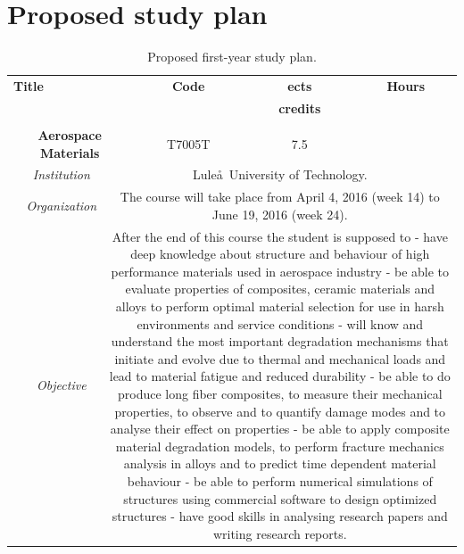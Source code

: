 \documentclass[a4paper, twoside,12pt, abstract]{scrartcl} %
\begin{document}

\clearscrheadings
\pagestyle{scrheadings}
\manualmark
\ofoot{\\\pagemark} %
\ifoot{} %
\setheadtopline{2pt}
\setheadsepline{0.5pt}
\setfootsepline{0.5pt}

\section{Proposed study plan}

\begin{center}
\small
\begin{longtable}{cccccc}
\caption{Proposed first-year study plan.}\\
    \toprule
  \multicolumn{3}{l}{\textbf{Title}}&\textbf{Code} &\textbf{\acrshort{ects}}&\textbf{Hours} \\
   &&&& \textbf{credits}&\\
    \midrule
    &&&&&\\
    \multicolumn{3}{p{0.5\textwidth}}{\textbf{Aerospace Materials}}&T7005T&7.5&\\
    &\textit{Institution}&\multicolumn{4}{p{0.7\textwidth}}{Lule\aa\ University of Technology.}\\
    &\textit{Organization}&\multicolumn{4}{p{0.7\textwidth}}{The course will take place from April 4, 2016 (week 14) to June 19, 2016 (week 24).}\\
    &\textit{Objective}&\multicolumn{4}{p{0.7\textwidth}}{After the end of this course the student is supposed to - have deep knowledge about structure and behaviour of high performance materials used in aerospace industry - be able to evaluate properties of composites, ceramic materials and alloys to perform optimal material selection for use in harsh environments and service conditions - will know and understand the most important degradation mechanisms that initiate and evolve due to thermal and mechanical loads and lead to material fatigue and reduced durability - be able to do produce long fiber composites, to measure their mechanical properties, to observe and to quantify damage modes and to analyse their effect on properties - be able to apply composite material degradation models, to perform fracture mechanics analysis in alloys and to predict time dependent material behaviour - be able to perform numerical simulations of structures using commercial software to design optimized structures - have good skills in analysing research papers and writing research reports.}\\

\end{longtable}
\end{center}
\end{document}
